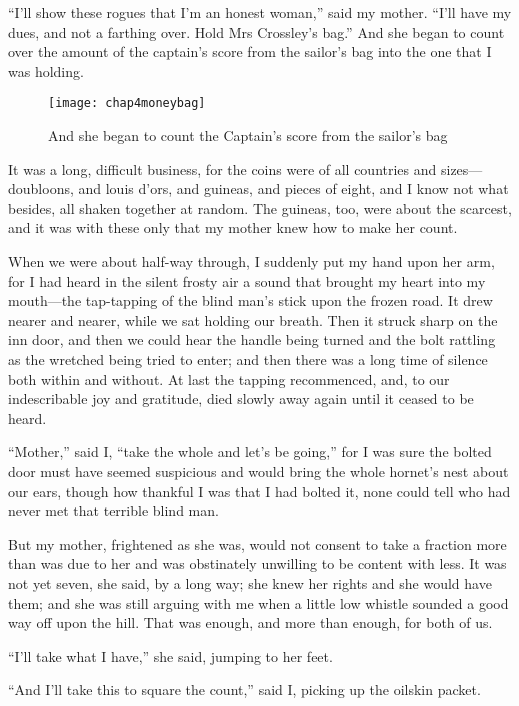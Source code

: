 \enquote{I’ll show these rogues that I’m an honest woman,} said my mother. \enquote{I’ll have my dues, and not a farthing over. Hold Mrs Crossley’s bag.} And she began to count over the amount of the captain’s score from the sailor’s bag into the one that I was holding.

\begin{figure}[p]
\centering
\texttt{[image: chap4moneybag]}
\caption[She began to count the Captain's score]{And she began to count the Captain's score from the sailor's bag}
\end{figure}

It was a long, difficult business, for the coins were of all countries and sizes---doubloons, and louis d’ors, and guineas, and pieces of eight, and I know not what besides, all shaken together at random. The guineas, too, were about the scarcest, and it was with these only that my mother knew how to make her count.

When we were about half-way through, I suddenly put my hand upon her arm, for I had heard in the silent frosty air a sound that brought my heart into my mouth---the tap-tapping of the blind man’s stick upon the frozen road. It drew nearer and nearer, while we sat holding our breath. Then it struck sharp on the inn door, and then we could hear the handle being turned and the bolt rattling as the wretched being tried to enter; and then there was a long time of silence both within and without. At last the tapping recommenced, and, to our indescribable joy and gratitude, died slowly away again until it ceased to be heard.

\enquote{Mother,} said I, \enquote{take the whole and let’s be going,} for I was sure the bolted door must have seemed suspicious and would bring the whole hornet’s nest about our ears, though how thankful I was that I had bolted it, none could tell who had never met that terrible blind man.

But my mother, frightened as she was, would not consent to take a fraction more than was due to her and was obstinately unwilling to be content with less. It was not yet seven, she said, by a long way; she knew her rights and she would have them; and she was still arguing with me when a little low whistle sounded a good way off upon the hill. That was enough, and more than enough, for both of us.

\enquote{I’ll take what I have,} she said, jumping to her feet.

\enquote{And I’ll take this to square the count,} said I, picking up the oilskin packet.

